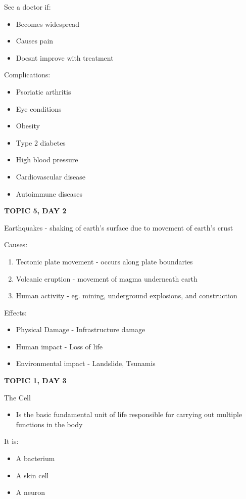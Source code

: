 {{See a doctor if:
\begin{itemize}
    \item Becomes widespread
    \item Causes pain
    \item Doesnt improve with treatment
\end{itemize}


Complications:
\begin{itemize}
    \item Psoriatic arthritis
    \item Eye conditions
    \item Obesity
    \item Type 2 diabetes
    \item High blood pressure 
    \item Cardiovascular disease
    \item Autoimmune diseases
\end{itemize}

\textbf{TOPIC 5, DAY 2}


Earthquakes - shaking of earth's surface due to movement of earth's crust


Causes:
\begin{enumerate}
    \item Tectonic plate movement - occurs along plate boundaries
    \item Volcanic eruption - movement of magma underneath earth
    \item Human activity - eg. mining, underground explosions, and construction
\end{enumerate}


Effects:
\begin{itemize}
    \item Physical Damage - Infrastructure damage
    \item Human impact - Loss of life
    \item Environmental impact - Landslide, Tsunamis
\end{itemize}

\textbf{TOPIC 1, DAY 3}


The Cell
\begin{itemize}
    \item Is the basic fundamental unit of life responsible for carrying out multiple functions in the body
\end{itemize}

It is:
\begin{itemize}
    \item A bacterium
    \item A skin cell
    \item A neuron
\end{itemize}

}}

